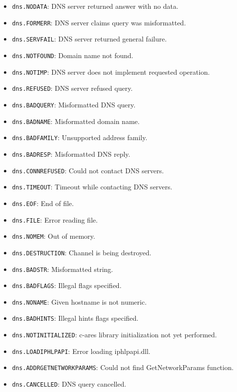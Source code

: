 \begin{itemize}
\item
  \texttt{dns.NODATA}: DNS server returned answer with no data.
\item
  \texttt{dns.FORMERR}: DNS server claims query was misformatted.
\item
  \texttt{dns.SERVFAIL}: DNS server returned general failure.
\item
  \texttt{dns.NOTFOUND}: Domain name not found.
\item
  \texttt{dns.NOTIMP}: DNS server does not implement requested
  operation.
\item
  \texttt{dns.REFUSED}: DNS server refused query.
\item
  \texttt{dns.BADQUERY}: Misformatted DNS query.
\item
  \texttt{dns.BADNAME}: Misformatted domain name.
\item
  \texttt{dns.BADFAMILY}: Unsupported address family.
\item
  \texttt{dns.BADRESP}: Misformatted DNS reply.
\item
  \texttt{dns.CONNREFUSED}: Could not contact DNS servers.
\item
  \texttt{dns.TIMEOUT}: Timeout while contacting DNS servers.
\item
  \texttt{dns.EOF}: End of file.
\item
  \texttt{dns.FILE}: Error reading file.
\item
  \texttt{dns.NOMEM}: Out of memory.
\item
  \texttt{dns.DESTRUCTION}: Channel is being destroyed.
\item
  \texttt{dns.BADSTR}: Misformatted string.
\item
  \texttt{dns.BADFLAGS}: Illegal flags specified.
\item
  \texttt{dns.NONAME}: Given hostname is not numeric.
\item
  \texttt{dns.BADHINTS}: Illegal hints flags specified.
\item
  \texttt{dns.NOTINITIALIZED}: c-ares library initialization not yet
  performed.
\item
  \texttt{dns.LOADIPHLPAPI}: Error loading iphlpapi.dll.
\item
  \texttt{dns.ADDRGETNETWORKPARAMS}: Could not find GetNetworkParams
  function.
\item
  \texttt{dns.CANCELLED}: DNS query cancelled.
\end{itemize}
